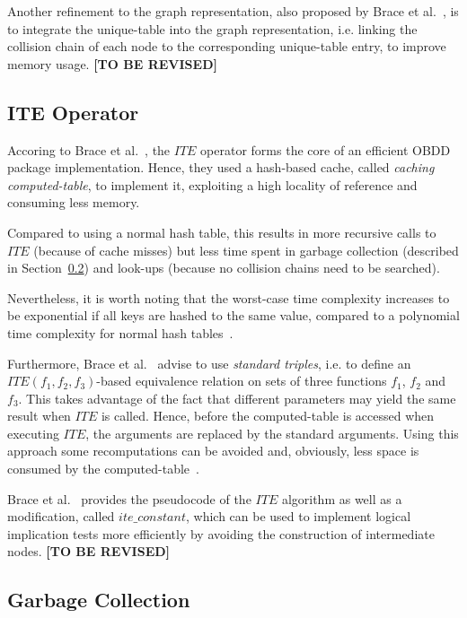 \documentclass{vldb}
\newcommand{\tbr}{\textbf{[TO BE REVISED]}}
\begin{document}
Another refinement to the graph representation, also proposed by Brace et
al.~\cite{BRACE90}, is to integrate the unique-table into the graph representation,
i.e. linking the collision chain of each node to the corresponding unique-table
entry, to improve memory usage. \tbr

\subsection{ITE Operator}
\label{subsec:ite-operator}

Accoring to Brace et al.~\cite{BRACE90}, the $ITE$ operator forms the core of an
efficient OBDD package implementation. Hence, they used a hash-based cache, called
\textit{caching computed-table}, to implement it, exploiting a high locality of
reference and consuming less memory.

Compared to using a normal hash table, this results in more recursive calls to 
$ITE$ (because of cache misses) but less time spent in garbage collection
(described in Section~\ref{subsec:garbage-collection}) and look-ups (because no
collision chains need to be searched).

Nevertheless, it is worth noting that the worst-case time complexity increases
to be exponential if all keys are hashed to the same value, compared to a
polynomial time complexity for normal hash tables~\cite{BRACE90}. 

Furthermore, Brace et al.~\cite{BRACE90} advise to use \textit{standard triples},
i.e. to define an $ITE(f_1, f_2, f_3)$-based equivalence relation on sets of
three functions $f_1$, $f_2$ and $f_3$. This takes advantage of the fact that
different parameters may yield the same result when $ITE$ is called. Hence, before
the computed-table is accessed when executing $ITE$, the arguments are replaced
by the standard arguments. Using this approach some recomputations can be avoided
and, obviously, less space is consumed by the computed-table~\cite{BRACE90}.

Brace et al.~\cite[p. 42]{BRACE90} provides the pseudocode of the $ITE$ algorithm
as well as a modification, called $ite\_constant$, which can be used to implement
logical implication tests more efficiently by avoiding the construction of
intermediate nodes. \tbr

\subsection{Garbage Collection}
\label{subsec:garbage-collection}
\end{document}
